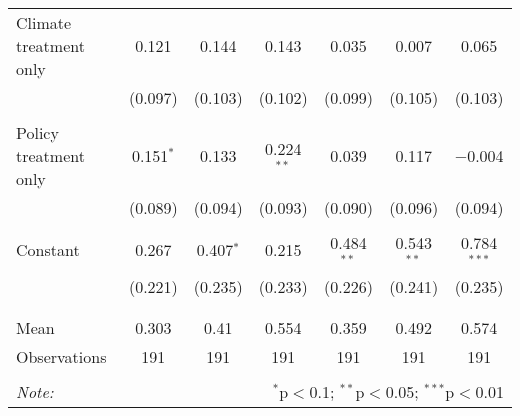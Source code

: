 \begin{tabular}{@{\extracolsep{5pt}}lcccccc}
 Climate treatment only & 0.121 & 0.144 & 0.143 & 0.035 & 0.007 & 0.065 \\ 
  & (0.097) & (0.103) & (0.102) & (0.099) & (0.105) & (0.103) \\ 
  & & & & & & \\ 
 Policy treatment only & 0.151$^{*}$ & 0.133 & 0.224$^{**}$ & 0.039 & 0.117 & $-$0.004 \\ 
  & (0.089) & (0.094) & (0.093) & (0.090) & (0.096) & (0.094) \\ 
  & & & & & & \\ 
 Constant & 0.267 & 0.407$^{*}$ & 0.215 & 0.484$^{**}$ & 0.543$^{**}$ & 0.784$^{***}$ \\ 
  & (0.221) & (0.235) & (0.233) & (0.226) & (0.241) & (0.235) \\ 
  & & & & & & \\ 
\hline \\[-1.8ex] 
Mean & 0.303 & 0.41 & 0.554 & 0.359 & 0.492 & 0.574 \\ 
Observations & 191 & 191 & 191 & 191 & 191 & 191 \\ 
\hline 
\hline \\[-1.8ex] 
\textit{Note:}  & \multicolumn{6}{r}{$^{*}$p$<$0.1; $^{**}$p$<$0.05; $^{***}$p$<$0.01} \\ 
\end{tabular} 
